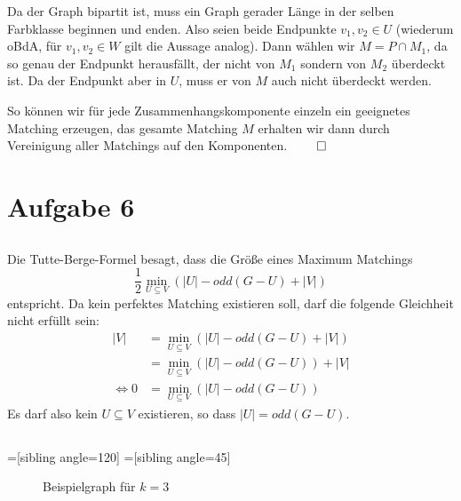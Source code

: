 \documentclass[a4paper]{article}
\begin{document}
Da der Graph bipartit ist, muss ein Graph gerader Länge in der selben
Farbklasse beginnen und enden. Also seien beide Endpunkte $v_1, v_2 \in U$
(wiederum oBdA, für $v_1, v_2 \in W$ gilt die Aussage analog).
Dann wählen wir $M = P \cap M_1$, da so genau der Endpunkt herausfällt, der
nicht von $M_1$ sondern von $M_2$ überdeckt ist. Da der Endpunkt aber in
$U$, muss er von $M$ auch nicht überdeckt werden.

So können wir für jede Zusammenhangskomponente einzeln ein geeignetes
Matching erzeugen, das gesamte Matching $M$ erhalten wir dann durch
Vereinigung aller Matchings auf den Komponenten. $\qed$

\section{Aufgabe 6}
\subsection{}
Die Tutte-Berge-Formel besagt, dass die Größe eines Maximum Matchings
\[
	\frac{1}{2} \min_{U \subseteq V} ( |U| - odd(G - U) + |V|)
\]
entspricht. Da kein perfektes Matching existieren soll, darf die folgende
Gleichheit nicht erfüllt sein:
\begin{align*}
|V| &= \min_{U \subseteq V} ( |U| - odd(G - U) + |V|) \\
	&= \min_{U \subseteq V} ( |U| - odd(G - U) ) + |V| \\
\Leftrightarrow 0 &= \min_{U \subseteq V} ( |U| - odd(G - U) )
\end{align*}
Es darf also kein $U \subseteq V$ existieren, so dass $|U| = odd(G - U)$.


\subsection{}

=[sibling angle=120]
=[sibling angle=45]
\begin{figure}[h]\caption{Beispielgraph für $k=3$}
\begin{center}
\end{center}
\end{figure}
\end{document}
